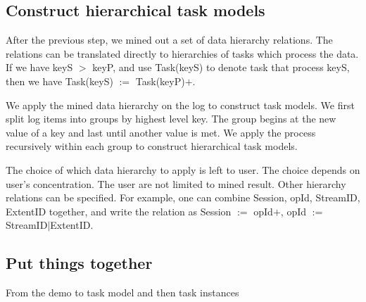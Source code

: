
\subsection{Construct hierarchical task models}


After the previous step, we mined out a set of data
hierarchy relations. The relations can be translated
directly to hierarchies of tasks which process the data. 
If we have keyS $>$ keyP, and use Task(keyS) to denote task
that process keyS, then we have Task(keyS) $:=$
Task(keyP)$+$.

We apply the mined data hierarchy on the log to construct
task models. We first split log items into groups by highest
level key. The group begins at the new value of a key and
last until another value is met. We apply the process
recursively within each group to construct hierarchical task
models.


The choice of which data hierarchy to apply is left to user.
The choice depends on user's concentration. The user are not
limited to mined result. Other hierarchy relations can be
specified. For example, one can combine Session, opId,
StreamID, ExtentID together, and write the relation as
Session $:=$ opId$+$, opId $:=$ StreamID$|$ExtentID.


\subsection{Put things together}

From the demo to task model and then task instances


